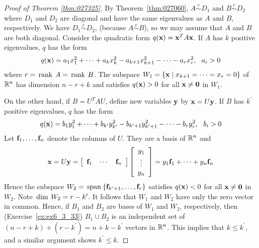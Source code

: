 \newpage
\begin{proof}[Proof of Theorem \ref{thm:027325}]

\noindent By Theorem~\ref{thm:027060}, $A \stackrel{c}{\sim} D_{1}$ and $B \stackrel{c}{\sim} D_{2}$ where $D_{1}$ and $D_{2}$ are diagonal and have the same eigenvalues as $A$ and $B$, respectively. We have $D_{1} \stackrel{c}{\sim} D_{2}$, (because $A \stackrel{c}{\sim} B$), so we may assume that $A$ and $B$ are both diagonal. Consider the quadratic form $q(\textbf{x}) = \textbf{x}^{T}A\textbf{x}$. If $A$ has $k$ positive eigenvalues, $q$ has the form
\begin{equation*}
q(\vect{x}) = a_{1}x_{1}^2 + \cdots + a_{k}x_{k}^2 - a_{k+1}x_{k+1}^2 - \cdots - a_{r}x_{r}^2, \ \ a_{i} > 0
\end{equation*}
where $r = \thinspace\operatorname{rank \medspace}A = \thinspace\operatorname{rank \medspace}B$. The subspace $W_{1} = \{\textbf{x} \mid x_{k + 1} = \cdots = x_{r} = 0\}$ of $\mathbb{R}^n$ has dimension $n - r + k$ and satisfies $q(\textbf{x}) > 0$ for all $\textbf{x} \neq \textbf{0}$ in $W_{1}$.

On the other hand, if $B = U^{T}AU$, define new variables $\textbf{y}$ by $\textbf{x} = U\textbf{y}$. If $B$ has $k^\prime$ positive eigenvalues, $q$ has the form
\begin{equation*}
q(\textbf{x}) = b_{1}y_{1}^2 + \cdots + b_{k^\prime}y_{k^\prime}^2 - b_{k^\prime+1}y_{k^\prime+1}^2 - \cdots - b_{r}y_{r}^2, \ \ b_{i} > 0
\end{equation*}
Let $\textbf{f}_{1}, \dots, \textbf{f}_{n}$ denote the columns of $U$. They are a basis of $\mathbb{R}^n$ and
\begin{equation*}
\textbf{x} = U\textbf{y} = \left[ \begin{array}{ccc}
\textbf{f}_{1} & \cdots & \textbf{f}_{n}
\end{array}\right] \left[ \begin{array}{c}
y_{1} \\
\vdots \\
y_{n}
\end{array}\right] = y_{1}\textbf{f}_{1} + \cdots + y_{n}\textbf{f}_{n}
\end{equation*}
Hence the subspace $W_{2} = \thinspace\operatorname{span\medspace}\{\textbf{f}_{k^{\prime}+1}, \dots, \textbf{f}_{r}\}$ satisfies $q(\textbf{x}) < 0$ for all $\textbf{x} \neq \textbf{0}$ in $W_{2}$. Note $\thinspace\operatorname{dim \medspace}W_{2} = r - k^{\prime}$. It follows that $W_{1}$ and $W_{2}$ have only the zero vector in common. Hence, if $B_{1}$ and $B_{2}$ are bases of $W_{1}$ and $W_{2}$, respectively, then (Exercise~\ref{ex:ex6_3_33}) $B_{1} \cup B_{2}$ is an independent set of $(n - r + k) + (r - k^{\prime}) = n + k - k^{\prime}$ vectors in $\mathbb{R}^n$. This implies that $k \leq k^{\prime}$, and a similar argument shows $k^{\prime} \leq k$.
\end{proof}

